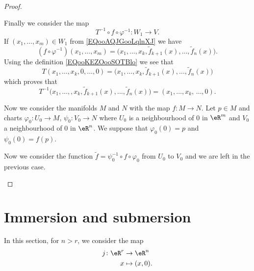 \begin{proof}
\begin{subproof}
\begin{subproof}

			Finally we consider the map
			\begin{equation}
				T^{-1}\circ f\circ \varphi^{-1}\colon W_1 \to V.
			\end{equation}
			If \( (x_1,\ldots, x_m)\in W_1\) from \eqref{EQooAQJGooLqlnXJ} we have
			\begin{equation}
				(f\circ \varphi^{-1})(x_1,\ldots, x_m)=\big( x_1,\ldots, x_k,\tilde f_{k+1}(x),\ldots, \tilde f_n(x) \big).
			\end{equation}
			Using the definition \eqref{EQooKEZOooSOTBlo} we see that
			\begin{equation}
				T(x_1,\ldots, x_k,0,\ldots, 0)=\big( x_1,\ldots, x_k,\tilde f_{k+1}(x),\ldots, \tilde f_n(x) \big)
			\end{equation}
			which proves that
			\begin{equation}
				T^{-1}\big( x_1,\ldots, ,x_k,\tilde f_{k+1}(x),\ldots, \tilde f_n(x) \big)=(x_1,\ldots, x_k,\,\ldots, 0).
			\end{equation}
		\end{subproof}


		Now we consider the manifolds \( M\) and \( N\) with the map \( f\colon M\to N\). Let \( p\in M\) and charts \( \varphi_0\colon U_0\to M\), \( \psi_0\colon V_0\to N\) where \( U_0\) is a neighbourhood of \( 0\) in \( \eR^m\) and \( V_0\) a neighbourhood of \( 0\) in \( \eR^n\). We suppose that \( \varphi_0(0)=p\) and \( \psi_0(0)=f(p)\).

		Now we consider the function \( \tilde f=\psi_0^{-1}\circ f\circ \varphi_0\) from \( U_0\) to \( V_0\) and we are left in the previous case.
	\end{subproof}
\end{proof}

\section{Immersion and submersion}

In this section, for \( n>r\), we consider the map
\begin{equation}		\label{EQooIMWDooOQqCYJ}
	\begin{aligned}
		j\colon \eR^r & \to \eR^n      \\
		x             & \mapsto (x,0).
	\end{aligned}
\end{equation}

